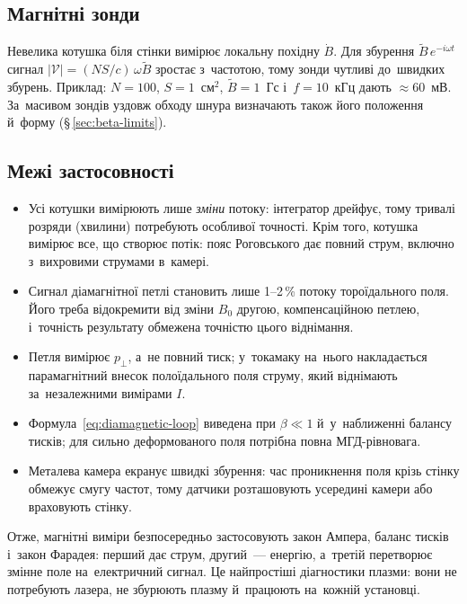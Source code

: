 \subsection*{Магнітні зонди}
Невелика котушка біля стінки вимірює локальну похідну $\dot B$. Для збурення
$\widetilde B\,e^{-i\omega t}$ сигнал $|\mathcal{V}|=(NS/c)\,\omega\widetilde B$ зростає з~частотою,
тому зонди чутливі до~швидких збурень. Приклад: $N=100$, $S=1$~см$^2$, $\widetilde B=1$~Гс
і~$f=10$~кГц дають $\approx60$~мВ. За~масивом зондів уздовж обходу шнура визначають
також його положення й~форму (§\,\ref{sec:beta-limits}).

\subsection*{Межі застосовності}
\begin{itemize}
\item Усі котушки вимірюють лише \emph{зміни} потоку: інтегратор дрейфує, тому тривалі розряди
  (хвилини) потребують особливої точності. Крім того, котушка вимірює все, що створює потік:
  пояс Роговського дає повний струм, включно з~вихровими струмами в~камері.
\item Сигнал діамагнітної петлі становить лише 1--2\,\% потоку тороїдального поля. Його треба
  відокремити від зміни $B_0$ другою, компенсаційною петлею, і~точність результату обмежена
  точністю цього віднімання.
\item Петля вимірює $p_\perp$, а~не повний тиск; у~токамаку на~нього накладається
  парамагнітний внесок полоїдального поля струму, який віднімають за~незалежними вимірами $I$.
\item Формула~\eqref{eq:diamagnetic-loop} виведена при $\beta\ll1$ й~у~наближенні балансу
  тисків; для сильно деформованого поля потрібна повна МГД-рівновага.
\item Металева камера екранує швидкі збурення: час проникнення поля крізь стінку обмежує
  смугу частот, тому датчики розташовують усередині камери або враховують стінку.
\end{itemize}

Отже, магнітні виміри безпосередньо застосовують закон Ампера, баланс тисків і~закон Фарадея: перший
дає струм, другий~--- енергію, а~третій перетворює змінне поле на~електричний
сигнал. Це найпростіші діагностики плазми: вони не потребують лазера, не збурюють плазму й~працюють
на~кожній установці.

